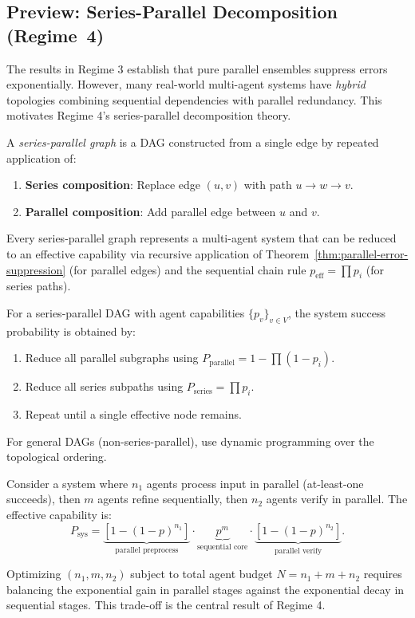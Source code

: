 \subsection{Preview: Series-Parallel Decomposition (Regime~4)}

The results in Regime 3 establish that pure parallel ensembles suppress errors exponentially.
However, many real-world multi-agent systems have \emph{hybrid} topologies combining sequential
dependencies with parallel redundancy. This motivates Regime 4's series-parallel decomposition theory.

\begin{definition}
A \emph{series-parallel graph} is a DAG constructed from a single edge by repeated application of:
\begin{enumerate}
  \item \textbf{Series composition}: Replace edge $(u,v)$ with path $u \to w \to v$.
  \item \textbf{Parallel composition}: Add parallel edge between $u$ and $v$.
\end{enumerate}
Every series-parallel graph represents a multi-agent system that can be reduced to an effective
capability via recursive application of Theorem~\ref{thm:parallel-error-suppression} (for parallel edges)
and the sequential chain rule $p_{\mathrm{eff}} = \prod p_i$ (for series paths).
\end{definition}

\begin{proposition}
For a series-parallel DAG with agent capabilities $\{p_v\}_{v \in V}$, the system success probability
is obtained by:
\begin{enumerate}
  \item Reduce all parallel subgraphs using $P_{\mathrm{parallel}} = 1 - \prod(1-p_i)$.
  \item Reduce all series subpaths using $P_{\mathrm{series}} = \prod p_i$.
  \item Repeat until a single effective node remains.
\end{enumerate}
For general DAGs (non-series-parallel), use dynamic programming over the topological ordering.
\end{proposition}

\begin{example}
Consider a system where $n_1$ agents process input in parallel (at-least-one succeeds), then
$m$ agents refine sequentially, then $n_2$ agents verify in parallel. The effective capability is:
\[
  P_{\mathrm{sys}} = \underbrace{[1-(1-p)^{n_1}]}_{\text{parallel preprocess}}
  \cdot \underbrace{p^m}_{\text{sequential core}}
  \cdot \underbrace{[1-(1-p)^{n_2}]}_{\text{parallel verify}}.
\]

Optimizing $(n_1, m, n_2)$ subject to total agent budget $N = n_1 + m + n_2$ requires balancing
the exponential gain in parallel stages against the exponential decay in sequential stages.
This trade-off is the central result of Regime 4.
\end{example}

